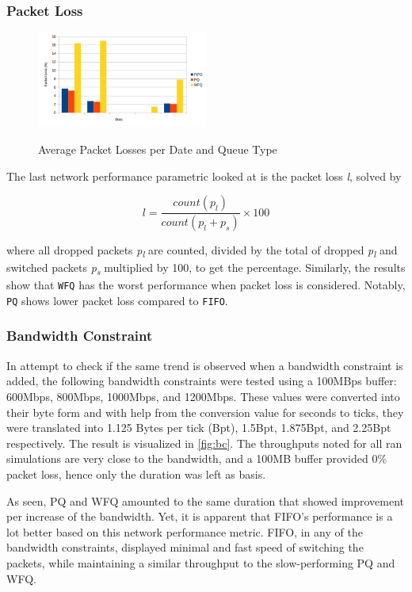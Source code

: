 \documentclass[journal]{IEEE/IEEEtran}
\begin{document}
\subsubsection{Packet Loss}
\begin{figure}
\includegraphics[width=0.5\textwidth]{packetloss}
\label{fig:packetloss}\caption{Average Packet Losses per Date and Queue Type}
\end{figure}

The last network performance parametric looked at is the packet loss \textit{l}, solved by

\[
	l = \frac{count(p_l)}{count(p_l + p_s)} \times 100
\]

where all dropped packets \textit{p\textsubscript{l}} are counted, divided by the total of dropped \textit{p\textsubscript{l}} and switched packets \textit{p\textsubscript{s}} multiplied by 100, to get the percentage. Similarly, the results show that \texttt{WFQ} has the worst performance when packet loss is considered. Notably, \texttt{PQ} shows lower packet loss compared to \texttt{FIFO}.

\subsubsection{Bandwidth Constraint}
In attempt to check if the same trend is observed when a bandwidth constraint is added, the following bandwidth constraints were tested using a 100MBps buffer: 600Mbps, 800Mbps, 1000Mbps, and 1200Mbps. These values were converted into their byte form and with help from the conversion value for seconds to ticks, they were translated into 1.125 Bytes per tick (Bpt), 1.5Bpt, 1.875Bpt, and 2.25Bpt respectively. The result is visualized in \ref{fig:bc}. The throughputs noted for all ran simulations are very close to the bandwidth, and a 100MB buffer provided 0\% packet loss, hence only the duration was left as  basis.

As seen, PQ and WFQ amounted to the same duration that showed improvement per increase of the bandwidth. Yet, it is apparent that FIFO's performance is a lot better based on this network performance metric. FIFO, in any of the bandwidth constraints, displayed minimal and fast speed of switching the packets, while maintaining a similar throughput to the slow-performing PQ and WFQ.
\end{document}
